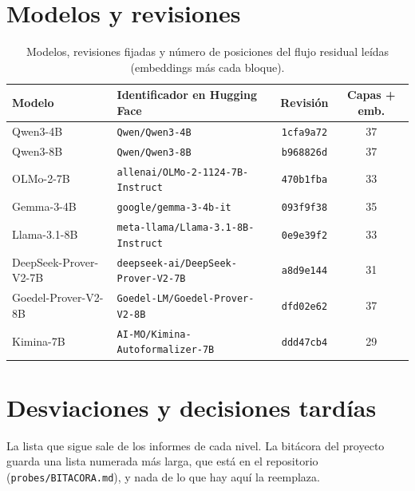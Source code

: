 \documentclass[10pt]{article}
\newcommand{\vr}[1]{\texttt{#1}}
\begin{document}



\appendix
\section{Modelos y revisiones}\label{app:modelos}
\begin{table}[h]
\centering
\caption{Modelos, revisiones fijadas y número de posiciones del flujo residual leídas (embeddings más cada bloque).}
\vspace{2pt}
\begin{tabular}{@{}llcc@{}}
\toprule
Modelo & Identificador en Hugging Face & Revisión & Capas + emb.\\
\midrule
Qwen3-4B              & \vr{Qwen/Qwen3-4B}                         & \vr{1cfa9a72} & 37\\
Qwen3-8B              & \vr{Qwen/Qwen3-8B}                         & \vr{b968826d} & 37\\
OLMo-2-7B             & \vr{allenai/OLMo-2-1124-7B-Instruct}       & \vr{470b1fba} & 33\\
Gemma-3-4B            & \vr{google/gemma-3-4b-it}                  & \vr{093f9f38} & 35\\
Llama-3.1-8B          & \vr{meta-llama/Llama-3.1-8B-Instruct}      & \vr{0e9e39f2} & 33\\
DeepSeek-Prover-V2-7B & \vr{deepseek-ai/DeepSeek-Prover-V2-7B}     & \vr{a8d9e144} & 31\\
Goedel-Prover-V2-8B   & \vr{Goedel-LM/Goedel-Prover-V2-8B}         & \vr{dfd02e62} & 37\\
Kimina-7B             & \vr{AI-MO/Kimina-Autoformalizer-7B}        & \vr{ddd47cb4} & 29\\
\bottomrule
\end{tabular}
\end{table}

\section{Desviaciones y decisiones tardías}\label{app:desviaciones}

La lista que sigue sale de los informes de cada nivel. La bitácora del proyecto guarda una lista numerada más larga,
que está en el repositorio (\vr{probes/BITACORA.md}), y nada de lo que hay aquí la reemplaza.
\end{document}
